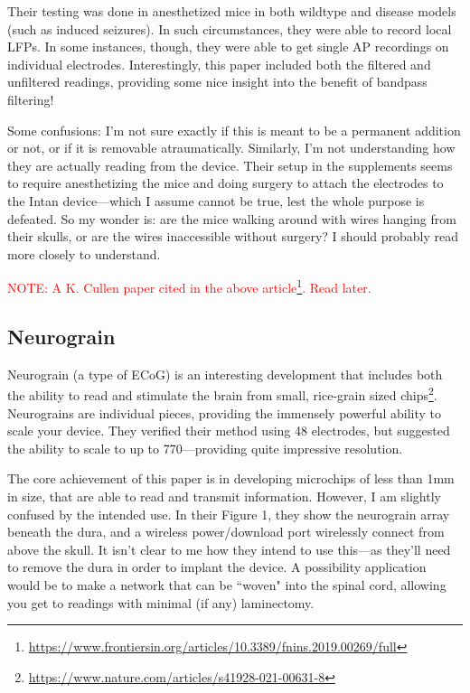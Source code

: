 Their testing was done in anesthetized mice in both wildtype and disease models (such as induced seizures). In such circumstances, they were able to record local LFPs. In some instances, though, they were able to get single AP recordings on individual electrodes. Interestingly, this paper included both the filtered and unfiltered readings, providing some nice insight into the benefit of bandpass filtering!\newline

Some confusions: I'm not sure exactly if this is meant to be a permanent addition or not, or if it is removable atraumatically. Similarly, I'm not understanding how they are actually reading from the device. Their setup in the supplements seems to require anesthetizing the mice and doing surgery to attach the electrodes to the Intan device---which I assume cannot be true, lest the whole purpose is defeated. So my wonder is: are the mice walking around with wires hanging from their skulls, or are the wires inaccessible without surgery? I should probably read more closely to understand.\newline


\textcolor{red}{NOTE: A K. Cullen paper cited in the above article\footnote{\url{https://www.frontiersin.org/articles/10.3389/fnins.2019.00269/full}}. Read later.}

\subsection{Neurograin}

Neurograin (a type of ECoG) is an interesting development that includes both the ability to read and stimulate the brain from small, rice-grain sized chips\footnote{\url{https://www.nature.com/articles/s41928-021-00631-8}}. Neurograins are individual pieces, providing the immensely powerful ability to scale your device. They verified their method using 48 electrodes, but suggested the ability to scale to up to 770---providing quite impressive resolution.\newline

The core achievement of this paper is in developing microchips of less than 1mm in size, that are able to read and transmit information. However, I am slightly confused by the intended use. In their Figure 1, they show the neurograin array beneath the dura, and a wireless power/download port wirelessly connect from above the skull. It isn't clear to me how they intend to use this---as they'll need to remove the dura in order to implant the device. A possibility application would be to make a network that can be ``woven" into the spinal cord, allowing you get to readings with minimal (if any) laminectomy. \newline

